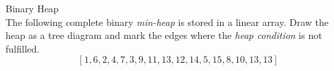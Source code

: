  Binary Heap \\
The following complete binary \textit{min-heap} is stored in a linear array.
Draw the heap as a tree diagram and mark the edges where the
\textit{heap condition} is not fulfilled.
\begin{displaymath}
  \left[ 1,6,2,4,7,3,9,11,13,12,14,5,15,8,10,13,13 \right]
\end{displaymath}
